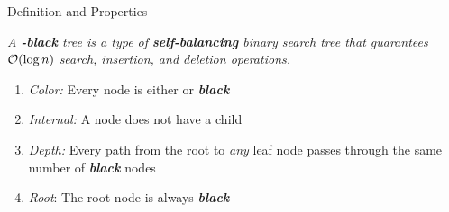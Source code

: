 \documentclass[aspectratio=169]{beamer}
\newcommand{\textib}[1]{\textit{\textbf{{#1}}}}
\newcommand{\red}{\textib{\color{red}{red }}}
\newcommand{\define}[1]{\begin{tcolorbox}[title={Definition}]\small{\textit{{#1}}}\end{tcolorbox}}
\begin{document}
\begin{frame}[fragile]{Definition and Properties}
    \define {
        A \textib{\color{red}{red}}\textib{-black} tree is a type of \textib{self-balancing} binary 
        search tree that guarantees ${\cal{O}}(\log n)$ search, insertion, and deletion operations.
    }
    \begin{minipage}{.45\textwidth}
        \begin{enumerate}[label=\textit{(\roman*)}]
            \item<0> \textit{Color:} Every node is either \red or \textib{black}
            \item<0> \textit{Internal:} A \red node does not have a \red child
            \item<0> \textit{Depth:} Every path from the root to \textit{any} leaf node passes through
                the same number of \textib{black} nodes
            \item \textit{Root}: The root node is always \textib{black}
        \end{enumerate}
    \end{minipage}
    \hfill
    \begin{minipage}{.5\textwidth}
        \centering
    \end{minipage}
\end{frame}
\end{document}
